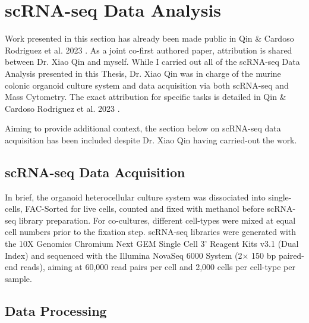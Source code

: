 \section{scRNA-seq Data Analysis}

Work presented in this section has already been made public in Qin \& Cardoso Rodriguez et al. 2023 \cite{cardoso_rodriguez_single-cell_2023}. As a joint co-first authored paper, attribution is shared between Dr. Xiao Qin and myself. While I carried out all of the scRNA-seq Data Analysis presented in this Thesis, Dr. Xiao Qin was in charge of the murine colonic organoid culture system and data acquisition via both scRNA-seq and Mass Cytometry. The exact attribution for specific tasks is detailed in Qin \& Cardoso Rodriguez et al. 2023 \cite{cardoso_rodriguez_single-cell_2023}. 

Aiming to provide additional context, the section below on scRNA-seq data acquisition has been included despite Dr. Xiao Qin having carried-out the work.





\subsection*{scRNA-seq Data Acquisition}

In brief, the organoid heterocellular culture system was dissociated into single-cells, FAC-Sorted for live cells, counted and fixed with methanol before scRNA-seq library preparation. For co-cultures, different cell-types were mixed at equal cell numbers prior to the fixation step. scRNA-seq libraries were generated with the 10X Genomics Chromium Next GEM Single Cell 3' Reagent Kits v3.1 (Dual Index) and sequenced with the Illumina NovaSeq 6000 System (2$\times$ 150 bp paired-end reads), aiming at 60,000 read pairs per cell and 2,000 cells per cell-type per sample.

\subsection*{Data Processing}

